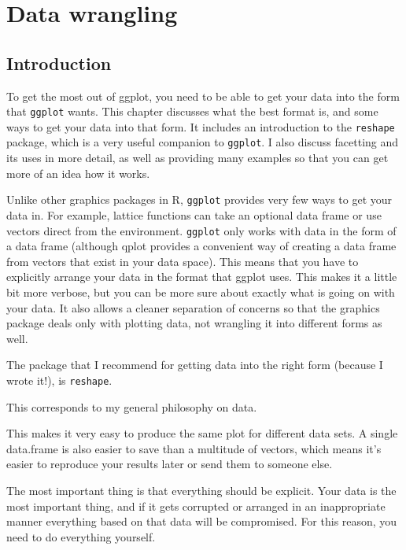 


\chapter{Data wrangling}

\section{Introduction}\label{sec:introduction}

To get the most out of ggplot, you need to be able to get your data into the form that {\tt ggplot} wants.  This chapter discusses what the best format is, and some ways to get your data into that form.  It includes an introduction to the {\tt reshape} package, which is a very useful companion to {\tt ggplot}.  I also discuss facetting and its uses in more detail, as well as providing many examples so that you can get more of an idea how it works.

Unlike other graphics packages in R, {\tt ggplot} provides very few ways to get your data in.  For example, lattice functions can take an optional data frame or use vectors direct from the environment.  {\tt ggplot} only works with data in the form of a data frame (although qplot provides a convenient way of creating a data frame from vectors that exist in your data space).  This means that you have to explicitly arrange your data in the format that ggplot uses.  This makes it a little bit more verbose, but you can be more sure about exactly what is going on with your data.  It also allows a cleaner separation of concerns so that the graphics package deals only with plotting data, not wrangling it into different forms as well.

The package that I recommend for getting data into the right form (because I wrote it!), is {\tt reshape}.

This corresponds to my general philosophy on data.  

This makes it very easy to produce the same plot for different data sets.  A single data.frame is also easier to save than a multitude of vectors, which means it's easier to reproduce your results later or send them to someone else.  

The most important thing is that everything should be explicit.  Your data is the most important thing, and if it gets corrupted or arranged in an inappropriate manner everything based on that data will be compromised.  For this reason, you need to do everything yourself.

